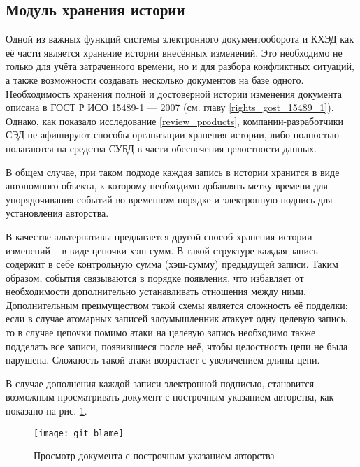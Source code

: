 \subsection{Модуль хранения истории} \label{research_history}

Одной из важных функций системы электронного документооборота и КХЭД как её части является хранение истории внесённых изменений. Это необходимо не только для учёта затраченного времени, но и для разбора конфликтных ситуаций, а также возможности создавать несколько документов на базе одного. Необходимость хранения полной и достоверной истории изменения документа описана в ГОСТ Р ИСО 15489-1 --- 2007 (см. главу \ref{rights_gost_15489_1}). Однако, как показало исследование \ref{review_products}, компании-разработчики СЭД не афишируют способы организации хранения истории, либо полностью полагаются на средства СУБД в части обеспечения целостности данных.

\vspace{\baselineskip}
В общем случае, при таком подходе каждая запись в истории хранится в виде автономного объекта, к которому необходимо добавлять метку времени для упорядочивания событий во временн\textit{о}м порядке и электронную подпись для установления авторства.

\vspace{\baselineskip}
В качестве альтернативы предлагается другой способ хранения истории изменений -- в виде цепочки хэш-сумм. В такой структуре каждая запись содержит в себе контрольную сумма (хэш-сумму) предыдущей записи. Таким образом, события связываются в порядке появления, что избавляет от необходимости дополнительно устанавливать отношения между ними. Дополнительным преимуществом такой схемы является сложность её подделки: если в случае атомарных записей злоумышленник атакует одну целевую запись, то в случае цепочки помимо атаки на целевую запись необходимо также подделать все записи, появившиеся после неё, чтобы целостность цепи не была нарушена. Сложность такой атаки возрастает с увеличением длины цепи.

\vspace{\baselineskip}
В случае дополнения каждой записи электронной подписью, становится возможным просматривать документ с построчным указанием авторства, как показано на рис. \ref{img:git_blame}.

\begin{figure}[h!]
  \centering
  \texttt{[image: git\_blame]}
  \caption{Просмотр документа с построчным указанием авторства}
  \label{img:git_blame}
\end{figure}

